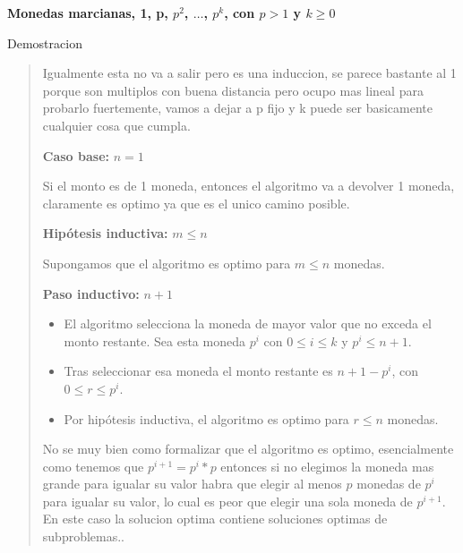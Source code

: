 \textbf{Monedas marcianas, 1, p, $p^2$, $\dots$, $p^k$, con $p>1$ y $k \geq 0$}\vspace{.2cm}

\textcolor{bibi}{Demostracion}
\begin{quote}
    Igualmente esta no va a salir pero es una induccion, se parece bastante al 1 porque son multiplos con buena distancia pero ocupo mas lineal para probarlo fuertemente, vamos a dejar a p fijo y k puede ser basicamente cualquier cosa que cumpla. \vspace{.2cm}

    \textbf{Caso base:} $n=1$ \vspace{.2cm}

    Si el monto es de 1 moneda, entonces el algoritmo va a devolver 1 moneda, claramente es optimo ya que es el unico camino posible. \vspace{.2cm}

    \textbf{Hipótesis inductiva:} $m \leq n$ \vspace{.2cm}
    
    Supongamos que el algoritmo es optimo para $m \leq n$ monedas. \vspace{.2cm}

    \textbf{Paso inductivo:} $n+1$ \vspace{.2cm}

    \begin{itemize}
        \item El algoritmo selecciona la moneda de mayor valor que no exceda el monto restante. Sea esta moneda $p^i$ con $0 \leq i \leq k$ y $p^i \leq n+1$. 
        \item Tras seleccionar esa moneda el monto restante es $n+1-p^i$, con $0 \leq r \leq p^i$.
        \item Por hipótesis inductiva, el algoritmo es optimo para $r \leq n$ monedas.
    \end{itemize}

    No se muy bien como formalizar que el algoritmo es optimo, esencialmente como tenemos que $p^{i+1}=p^i * p$ entonces si no elegimos la moneda mas grande para igualar su valor habra que elegir al menos $p$ monedas de $p^i$ para igualar su valor, lo cual es peor que elegir una sola moneda de $p^{i+1}$. En este caso la solucion optima contiene soluciones optimas de subproblemas.. \vspace{.2cm}
\end{quote}